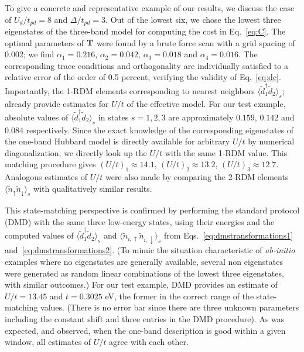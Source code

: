 To give a concrete and representative example of our results, we discuss the case of 
$U_d/t_{pd}=8$ and $\Delta/t_{pd}=3$. Out of the lowest six, we chose the lowest three eigenstates 
of the three-band model for computing the cost in Eq.~\ref{eq:C}. The 
optimal parameters of ${\bf T}$ were found by a brute force scan with a grid spacing of $0.002$; we find 
$\alpha_1=0.216$, $\alpha_2=0.042$, $\alpha_3=0.018$ and $\alpha_4=0.016$. 
The corresponding trace conditions and orthogonality are individually 
satisfied to a relative error of the order of 0.5 percent, verifying 
the validity of Eq.~\ref{eq:dc}. 
Importantly, the 1-RDM elements corresponding to nearest neighbors $\langle \tilde{d}_1^{\dagger} \tilde{d}_2 \rangle_s$; 
already provide estimates for $U/t$ of the effective model. 
For our test example, absolute values of $\langle \tilde{d}_1^{\dagger} \tilde{d}_2 \rangle_s$ 
in states $s=1,2,3$ are approximately $0.159$, $0.142$ and $0.084$ respectively. 
Since the exact knowledge of the corresponding eigenstates of the one-band Hubbard model is directly available for arbitrary 
$U/t$ by numerical diagonalization, we directly look up the $U/t$ with the same 1-RDM value.
This matching procedure gives $(U/t)_1 \approx 14.1 $, $(U/t)_2 \approx 13.2 $, $(U/t)_3 \approx 12.7 $. 
Analogous estimates of $U/t$ were also made by comparing the 2-RDM elements $\langle \tilde{n}_{\uparrow} \tilde{n}_{\downarrow} \rangle_s$ 
with qualitatively similar results. 

This state-matching perspective is confirmed by performing the standard protocol (DMD) with the same three low-energy states, 
using their energies and the computed values of $\langle \tilde{d}_1^{\dagger} \tilde{d}_2 \rangle_s$ 
and $\langle \tilde{n}_{i,\uparrow} \tilde{n}_{i,\downarrow} \rangle_{s}$ from Eqs.~\eqref{eq:dmstransformations1} 
and~\eqref{eq:dmstransformations2}. 
(To mimic the situation characteristic of \textit{ab-initio} examples where no eigenstates are generally available, 
several non eigenstates were generated as random linear combinations of the lowest three eigenstates, with 
similar outcomes.) For our test example, DMD provides an estimate of $U/t = 13.45 $ and $t = 0.3025 $ eV, 
the former in the correct range of the state-matching values. (There is no error bar since there 
are three unknown parameters including the constant shift and three entries in the DMD procedure). 
As was expected, and observed, when the one-band description is good within a given window, 
all estimates of $U/t$ agree with each other. 

